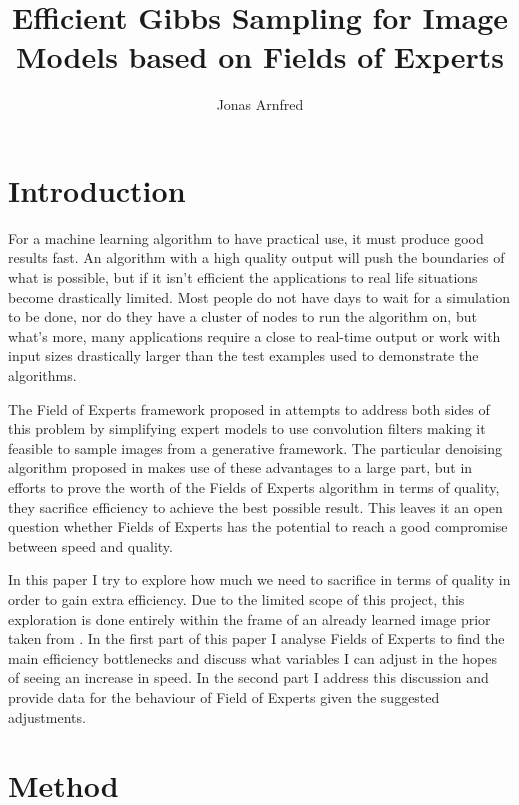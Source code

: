 \documentclass{article}
\begin{document}
\title{Efficient Gibbs Sampling for Image Models based on Fields of 
Experts}

\author{Jonas Arnfred}

\maketitle

\section{Introduction}

For a machine learning algorithm to have practical use, it must produce 
good results fast. An algorithm with a high quality output will push the 
boundaries of what is possible, but if it isn't efficient the 
applications to real life situations become drastically limited.  Most 
people do not have days to wait for a simulation to be done, nor do they 
have a cluster of nodes to run the algorithm on, but what's more, many 
applications require a close to real-time output or work with input 
sizes drastically larger than the test examples used to demonstrate the 
algorithms.

The Field of Experts framework proposed in \citep{stefan} attempts to 
address both sides of this problem by simplifying expert models to use 
convolution filters making it feasible to sample images from a 
generative framework. The particular denoising algorithm proposed in 
\citep{uwe} makes use of these advantages to a large part, but in 
efforts to prove the worth of the Fields of Experts algorithm in terms 
of quality, they sacrifice efficiency to achieve the best possible 
result. This leaves it an open question whether Fields of Experts has 
the potential to reach a good compromise between speed and quality.

In this paper I try to explore how much we need to sacrifice in terms of 
quality in order to gain extra efficiency. Due to the limited scope of 
this project, this exploration is done entirely within the frame of an 
already learned image prior taken from \citep{uwe}. In the first part of 
this paper I analyse Fields of Experts to find the main efficiency 
bottlenecks and discuss what variables I can adjust in the hopes of 
seeing an increase in speed. In the second part I address this 
discussion and provide data for the behaviour of Field of Experts given 
the suggested adjustments.

\section{Method}
\end{document}
